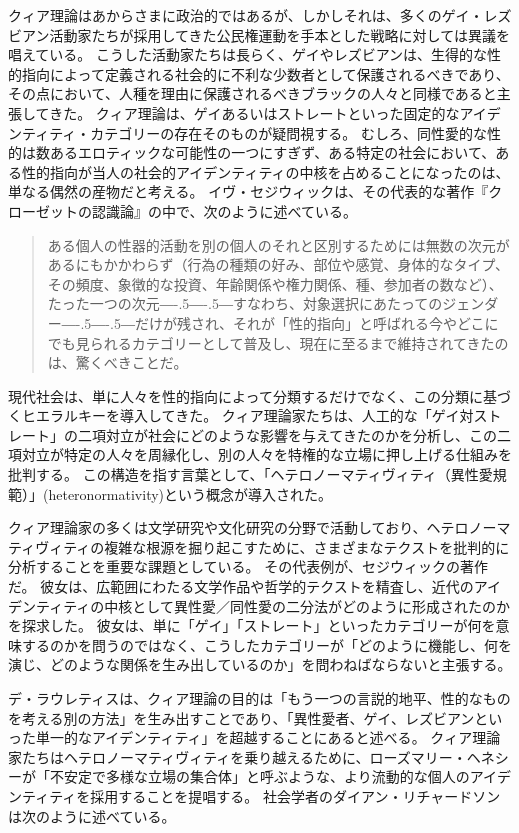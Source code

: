\documentclass[paper=a4,book,openany]{jlreq}
\newcommand{\ig}[1]{}           %
\def\DDASH{―\kern-.5\zw―\kern-.5\zw―}
\begin{document}
クィア理論はあからさまに政治的ではあるが、しかしそれは、多くのゲイ・レズビアン活動家たちが採用してきた公民権運動を手本とした戦略に対しては異議を唱えている。
こうした活動家たちは長らく、ゲイやレズビアンは、生得的な性的指向によって定義される社会的に不利な少数者として保護されるべきであり、その点において、人種を理由に保護されるべきブラックの人々と同様であると主張してきた。
クィア理論は、ゲイあるいはストレートといった固定的なアイデンティティ・カテゴリーの存在そのものが疑問視する。
むしろ、同性愛的な性的は数あるエロティックな可能性の一つにすぎず、ある特定の社会において、ある性的指向が当人の社会的アイデンティティの中核を占めることになったのは、単なる偶然の産物だと考える。
イヴ・セジウィックは、その代表的な著作『クローゼットの認識論』の中で、次のように述べている。

\begin{quote}
  ある個人の性器的活動を別の個人のそれと区別するためには無数の次元があるにもかかわらず（行為の種類の好み、部位や感覚、身体的なタイプ、その頻度、象徴的な投資、年齢関係や権力関係、種、参加者の数など）、たった一つの次元{\DDASH}すなわち、対象選択にあたってのジェンダー{\DDASH}だけが残され、それが「性的指向」と呼ばれる今やどこにでも見られるカテゴリーとして普及し、現在に至るまで維持されてきたのは、驚くべきことだ。
\citep{sedgwick90:_epist_closet}

\end{quote}

現代社会は、単に人々を性的指向によって分類するだけでなく、この分類に基づくヒエラルキーを導入してきた。
クィア理論家たちは、人工的な「ゲイ対ストレート」の二項対立が社会にどのような影響を与えてきたのかを分析し、この二項対立が特定の人々を周縁化し、別の人々を特権的な立場に押し上げる仕組みを批判する。
この構造を指す言葉として、「ヘテロノーマティヴィティ（異性愛規範）」(heteronormativity)という概念が導入された\citep{warner91:_introd}。

クィア理論家の多くは文学研究や文化研究の分野で活動しており、ヘテロノーマティヴィティの複雑な根源を掘り起こすために、さまざまなテクストを批判的に分析することを重要な課題としている。
その代表例が、セジウィックの著作だ。
彼女は、広範囲にわたる文学作品や哲学的テクストを精査し、近代のアイデンティティの中核として異性愛／同性愛の二分法がどのように形成されたのかを探求した。
彼女は、単に「ゲイ」「ストレート」といったカテゴリーが何を意味するのかを問うのではなく、こうしたカテゴリーが「どのように機能し、何を演じ、どのような関係を生み出しているのか」を問わねばならないと主張する\citep[p.27]{sedgwick90:_epist_closet}。

デ・ラウレティスは、クィア理論の目的は「もう一つの言説的地平、性的なものを考える別の方法」を生み出すことであり、「異性愛者、ゲイ、レズビアンといった単一的なアイデンティティ」を超越することにあると述べる\citep[p.iv]{lauretis91:_diff}。
クィア理論家たちはヘテロノーマティヴィティを乗り越えるために、ローズマリー・ヘネシーが「不安定で多様な立場の集合体」と呼ぶような、より流動的な個人のアイデンティティを採用することを提唱する\citep[p.965]{hennessy93:_queer_theor}。
社会学者のダイアン・リチャードソン\ig{Diane Richardson}は次のように述べている。
\end{document}
